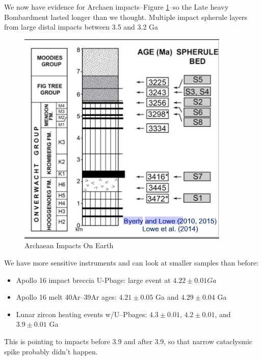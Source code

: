 \documentclass[]{article}
\begin{document}
We now have evidence for Archaen impacts--Figure \ref{fig:ArchaeanImpactsOnEarth}--so the Late heavy Bombardment lasted longer than we thought. Multiple impact spherule layers from large distal impacts between 3.5 and 3.2 Ga
 
\begin{figure}[H]
	\caption{Archaean Impacts On Earth}\label{fig:ArchaeanImpactsOnEarth}
	\includegraphics[width=0.9\textwidth]{ArchaeanImpactsOnEarth}
\end{figure}

We have more sensitive instruments and can look at smaller samples than before:
\begin{itemize}
	\item Apollo 16 impact breccia U-Pbage: large event at $4.22\pm0.01Ga$ 
	\item Apollo 16 melt 40Ar–39Ar ages: $4.21\pm0.05$ Ga and  $4.29\pm0.04$ Ga
	\item Lunar zircon heating events w/U–Pbages:  $4.3\pm0.01$,  $4.2\pm0.01$, and  $3.9\pm0.01$ Ga
\end{itemize}

This is pointing to impacts before 3.9 and after 3.9, so that narrow cataclysmic spike probably didn't happen.
\end{document}
